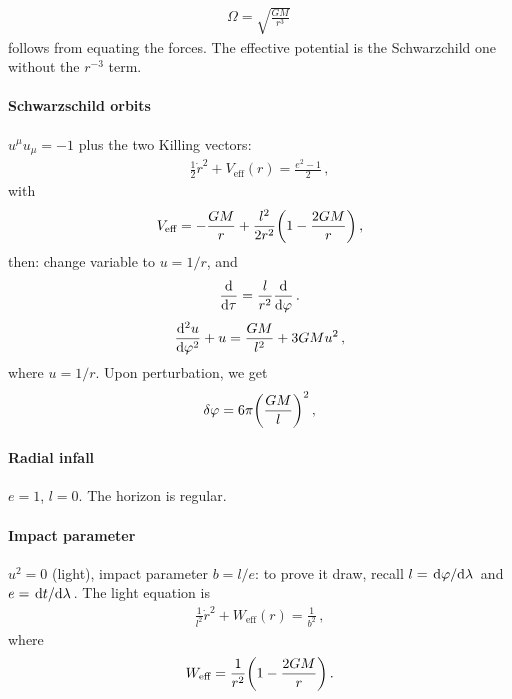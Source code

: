 \documentclass[main.tex]{subfiles}
\begin{document}
\begin{align}
\Omega = \sqrt{\frac{GM}{r^3}}
\,
\end{align}
%
follows from equating the forces.
The effective potential is the Schwarzchild one without the \(r^{-3}\) term.

\paragraph{Schwarzschild orbits}

\(u^{\mu } u_{\mu } = -1\) plus the two Killing vectors: 
%
\begin{align}
\frac{1}{2}\dot{r}^2 + V _{\text{eff}} (r) = \frac{e^2-1}{2}
\,,
\end{align}
%
with
%
\begin{align}
V _{\text{eff}} = - \frac{GM}{r} + \frac{l^2}{2 r^2} \qty(1 - \frac{2GM}{r})
\,,
\end{align}
%
then: change variable to \(u = 1/r\), and
%
\begin{align}
\dv{}{\tau } = \frac{l}{r^2} \dv{}{\varphi }
\,.
\end{align}
%
\begin{align}
\dv[2]{u}{\varphi } + u = \frac{GM}{l^2} + 3GMu^2
\,,
\end{align}
%
where \(u = 1/r\). Upon perturbation, we get 
%
\begin{align}
\delta \varphi = 6 \pi \qty(\frac{GM}{l})^2
\,,
\end{align}
%

\paragraph{Radial infall}

\(e = 1\), \(l =0 \). The horizon is regular. 
%

\paragraph{Impact parameter}

\(u^2= 0\) (light), impact parameter \(b = l/e\): to prove it draw, recall \(l = \dv*{\varphi }{\lambda }\) and \(e =
\dv*{t}{\lambda }\). 
The light equation is 
%
\begin{align}
\frac{1}{l^2} \dot{r}^2  + W _{\text{eff}} (r)
= \frac{1}{b^2}
\,,
\end{align}
%
where 
%
\begin{align}
W _{\text{eff}} = \frac{1}{r^2} \qty(1 - \frac{2GM}{r})
\,.
\end{align}
\end{document}
